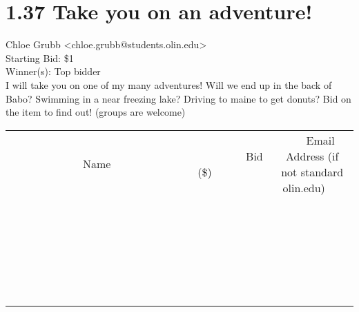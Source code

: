 \documentclass[11pt]{article}
\begin{document}
					\section*{1.37 Take you on an adventure!}
					Chloe Grubb <chloe.grubb@students.olin.edu> \\
					Starting Bid: \$1 \\
					Winner(s): Top bidder \\
					I will take you on one of my many adventures! Will we end up in the back of Babo? Swimming in a near freezing lake? Driving to maine to get donuts? Bid on the item to find out! (groups are welcome) \\
					[6ex]
					\begin{tabular}{c c c}
						~~~~~~~~~~~~~Name~~~~~~~~~~~~~ & ~~~~~~~~~Bid (\$)~~~~~~~~~ & ~~~Email Address (if not standard olin.edu)~~~ \\
				
 & & \\
\hline
 & & \\
\hline
 & & \\
\hline
 & & \\
\hline
 & & \\
\hline
 & & \\
\hline
 & & \\
\hline
 & & \\
\hline
 & & \\
\hline
 & & \\
\hline
 & & \\
\hline
 & & \\
\hline
 & & \\
\hline
 & & \\
\hline
 & & \\
\hline
 & & \\
\hline
 & & \\
\hline
 & & \\
\hline
 & & \\
\hline
 & & \\
\hline
 & & \\
\hline
 & & \\
\hline
 & & \\
\hline
 & & \\
\hline
 & & \\
\hline
 & & \\
\hline
					\end{tabular}
					\clearpage
				
\end{document}
